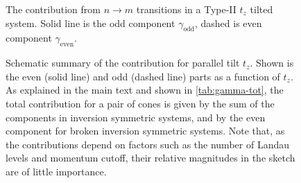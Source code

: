 \begin{figure}[ht]
{
  } %
  \caption{The contribution from \( n\to m \) transitions in a Type-II \(t_z\) tilted system.
    Solid line is the odd component \( \gamma_{\text{odd}} \), dashed is even component \( \gamma_{\text{even}} \).
  }
  \label{fig:contribtzII}
\end{figure}

\begin{figure}[p]
  \centering
  \caption{
    Schematic summary of the contribution for parallel tilt \( t_z \).
    Shown is the even (solid line) and odd (dashed line) parts as a function of \( t_z \).
    As explained in the main text and shown in \cref{tab:gamma-tot}, the total contribution for a pair of cones is given by the sum of the components in inversion symmetric systems, and by the even component for broken inversion symmetric systems.
    Note that, as the contributions depend on factors such as the number of Landau levels and momentum cutoff, their relative magnitudes in the sketch are of little importance.
    \label{fig:scetch}
  }
\end{figure}

\FloatBarrier
